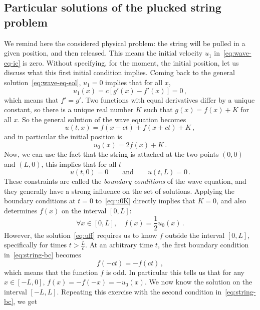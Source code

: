 \subsection{Particular solutions of the plucked string problem}
We remind here the considered physical problem: the string will be pulled in a given
position, and then released. This means the initial velocity $u_1$ in~\cref{eq:wave-eq-ic}
is zero. Without specifying, for the moment, the initial position, let us discuss what
this first initial condition implies. Coming back to the general
solution~\cref{eq:wave-eq-sol}, $u_1=0$ implies that for all $x$,
\begin{equation}
  u_1(x)=c[g'(x)-f'(x)]=0\,,
\end{equation}
which means that $f'=g'$. Two functions with equal derivatives differ by a unique
constant, so there is a unique real number $K$ such that $g(x)=f(x)+K$ for all $x$. So the
general solution of the wave equation becomes
\begin{equation}
  u(t,x)=f(x-ct)+f(x+ct)+K\,,\label{eq:uff}
\end{equation}
and in particular the initial position is
\begin{equation}
  u_0(x)=2f(x)+K\,.\label{eq:u0K}
\end{equation}
Now, we can use the fact that the string is attached at the two points $(0,0)$ and
$(L,0)$, this implies that for all $t$
\begin{equation}
  u(t,0)=0\qquad\text{and}\qquad u(t,L)=0\,.\label{eq:string-bc}
\end{equation}
These constraints are called the \emph{boundary conditions} of the wave equation, and they
generally have a strong influence on the set of solutions. Applying the boundary
conditions at $t=0$ to~\cref{eq:u0K} directly implies that $K=0$, and also determines $f(x)$ on the interval $[0,L]$:
\begin{equation}
  \forall x\in[0,L],\quad f(x)=\frac{1}{2}u_0(x)\,.
\end{equation}
However, the solution~\cref{eq:uff} requires us to know $f$ outside the interval $[0,L]$, specifically for times
$t>\frac{L}{c}$. At an arbitrary time $t$, the first boundary condition in~\cref{eq:string-bc}
becomes
\begin{equation}
  f(-ct)=-f(ct)\,,
\end{equation}
which means that the function $f$ is odd. In particular this tells us that for any $x\in[-L,0]$, $f(x)=-f(-x)=-u_0(x)$. We now know the solution on the interval $[-L,L]$. Repeating this exercise with the second condition in~\cref{eq:string-bc}, we get

